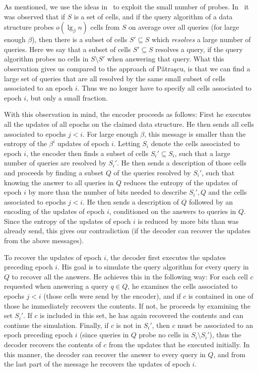 \documentclass[letterpaper]{article}
\begin{document}
As mentioned, we use the ideas in~\cite{pani:metric} to exploit the
small number of probes. In~\cite{pani:metric} it was observed that if
$S$ is a set of cells, and if the query algorithm of a data structure
probes $o(\lg_\beta n)$ cells from $S$ on average over all queries
(for large enough $\beta$), then there is a subset of cells $S'
\subseteq S$ which \emph{resolves} a large number of queries. Here we
say that a subset of cells $S' \subseteq S$ resolves a query, if the
query algorithm probes no cells in $S \setminus S'$ when answering
that query. What this observation gives us compared to the approach of
P{\v a}tra{\c s}cu, is that we can find a large set of queries that
are all resolved by the same small subset of cells associated to an
epoch $i$. Thus we no longer have to specify all cells associated to
epoch $i$, but only a small fraction.

With this observation in mind, the encoder proceeds as follows: First
he executes all the updates of all epochs on the claimed data
structure. He then sends all cells associated to epochs $j<i$. For
large enough $\beta$, this message is smaller than the entropy of the
$\beta^i$ updates of epoch $i$. Letting $S_i$ denote the cells
associated to epoch $i$, the encoder then finds a subset of cells
$S_i' \subseteq S_i$, such that a large number of queries are resolved
by $S_i'$. He then sends a description of those cells and proceeds by
finding a subset $Q$ of the queries resolved by $S_i'$, such that
knowing the answer to all queries in $Q$ reduces the entropy of the
updates of epoch $i$ by more than the number of bits needed to
describe $S_i',Q$ and the cells associated to epochs $j<i$. He then
sends a description of $Q$ followed by an encoding of the updates of
epoch $i$, conditioned on the answers to queries in $Q$. Since the
entropy of the updates of epoch $i$ is reduced by more bits than was
already send, this gives our contradiction (if the decoder can recover
the updates from the above messages).

To recover the updates of epoch $i$, the decoder first executes the
updates preceding epoch $i$. His goal is to simulate the query
algorithm for every query in $Q$ to recover all the answers. He
achieves this in the following way: For each cell $c$ requested when
answering a query $q \in Q$, he examines the cells associated to
epochs $j<i$ (those cells were send by the encoder), and if $c$ is
contained in one of those he immediately recovers the contents. If
not, he proceeds by examining the set $S_i'$. If $c$ is included in
this set, he has again recovered the contents and can continue the
simulation. Finally, if $c$ is not in $S_i'$, then $c$ must be
associated to an epoch preceding epoch $i$ (since queries in $Q$ probe
no cells in $S_i \setminus S_i'$), thus the decoder recovers the
contents of $c$ from the updates that he executed initially. In this
manner, the decoder can recover the answer to every query in $Q$, and
from the last part of the message he recovers the updates of epoch
$i$. 
\end{document}

